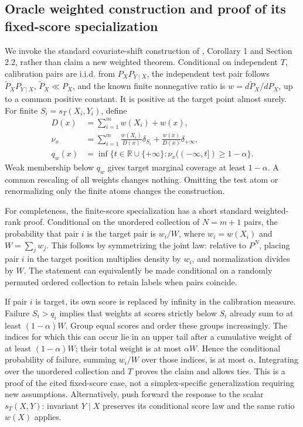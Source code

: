 \documentclass{article}
\theoremstyle{plain}
\begin{document}
\subsection{Oracle weighted construction and proof of its fixed-score specialization}
\label{app:weighted-proof}
We invoke the standard covariate-shift construction of \citet{tibshirani2019covariateshift}, Corollary 1 and Section 2.2, rather than claim a new weighted theorem. Conditional on independent $T$, calibration pairs are i.i.d. from $P_XP_{Y\mid X}$, the independent test pair follows $\widetilde P_XP_{Y\mid X}$, $\widetilde P_X\ll P_X$, and the known finite nonnegative ratio is $w=d\widetilde P_X/dP_X$, up to a common positive constant. It is positive at the target point almost surely. For finite $S_i=s_T(X_i,Y_i)$, define
\begin{align}
 D(x)&=\sum_{i=1}^m w(X_i)+w(x),\\
 \nu_x&=\sum_{i=1}^m\frac{w(X_i)}{D(x)}\delta_{S_i}
       +\frac{w(x)}{D(x)}\delta_{+\infty},\\
 q_w(x)&=\inf\{t\in\mathbb{R}\cup\{+\infty\}:\nu_x((-\infty,t])\geq1-\alpha\}.
 \label{eq:weighted}
\end{align}
Weak membership below $q_w$ gives target marginal coverage at least $1-\alpha$. A common rescaling of all weights changes nothing. Omitting the test atom or renormalizing only the finite atoms changes the construction.

For completeness, the finite-score specialization has a short standard weighted-rank proof. Conditional on the unordered collection of $N=m+1$ pairs, the probability that pair $i$ is the target pair is $w_i/W$, where $w_i=w(X_i)$ and $W=\sum_jw_j$. This follows by symmetrizing the joint law: relative to $P^N$, placing pair $i$ in the target position multiplies density by $w_i$, and normalization divides by $W$. The statement can equivalently be made conditional on a randomly permuted ordered collection to retain labels when pairs coincide.

If pair $i$ is target, its own score is replaced by infinity in the calibration measure. Failure $S_i>q_i$ implies that weights at scores strictly below $S_i$ already sum to at least $(1-\alpha)W$. Group equal scores and order these groups increasingly. The indices for which this can occur lie in an upper tail after a cumulative weight of at least $(1-\alpha)W$; their total weight is at most $\alpha W$. Hence the conditional probability of failure, summing $w_i/W$ over those indices, is at most $\alpha$. Integrating over the unordered collection and $T$ proves the claim and allows ties. This is a proof of the cited fixed-score case, not a simplex-specific generalization requiring new assumptions. Alternatively, push forward the response to the scalar $s_T(X,Y)$: invariant $Y\mid X$ preserves its conditional score law and the same ratio $w(X)$ applies.
\end{document}

